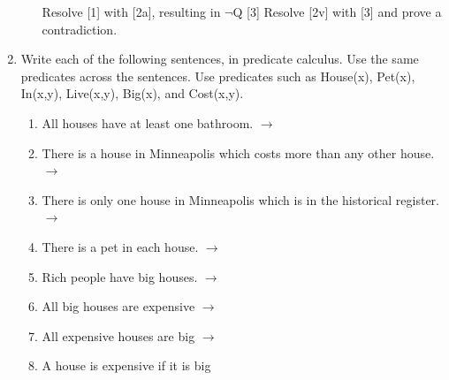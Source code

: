 \documentclass[10pt]{article}
\begin{document}
\begin{enumerate}
\begin{enumerate}
            Resolve [1] with [2a], resulting in $\neg$Q [3] \newline
            Resolve [2v] with [3] and prove a contradiction.
		\end{enumerate}
    \item Write each of the following sentences, in predicate calculus. Use the same predicates across the sentences. Use predicates such as House(x), Pet(x), In(x,y), Live(x,y), Big(x), and Cost(x,y).
    	\begin{enumerate}
    		\item All houses have at least one bathroom. \newline
            $\rightarrow$ 
            \item There is a house in Minneapolis which costs more than any other house. \newline
            $\rightarrow$ 
            \item There is only one house in Minneapolis which is in the historical register. \newline
            $\rightarrow$ 
            \item There is a pet in each house. \newline
            $\rightarrow$ 
            \item Rich people have big houses. \newline
            $\rightarrow$ 
            \item All big houses are expensive \newline
            $\rightarrow$ 
            \item All expensive houses are big \newline
            $\rightarrow$ 
            \item A house is expensive if it is big \newline

\end{enumerate}
\end{enumerate}
\end{document}
